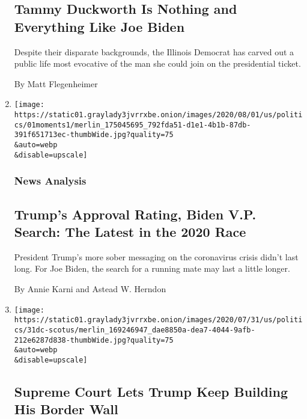 \begin{enumerate}
{  \subsection{Tammy Duckworth Is Nothing and Everything Like Joe
  Biden}\label{tammy-duckworth-is-nothing-and-everything-like-joe-biden}}

  Despite their disparate backgrounds, the Illinois Democrat has carved
  out a public life most evocative of the man she could join on the
  presidential ticket.

  By Matt Flegenheimer
\item
  \href{/2020/08/01/us/politics/trump-biden-polls-vp.html}{}

  \texttt{[image: https://static01.graylady3jvrrxbe.onion/images/2020/08/01/us/politics/01moments1/merlin\_175045695\_792fda51-d1e1-4b1b-87db-391f651713ec-thumbWide.jpg?quality=75\\\&auto=webp\\\&disable=upscale]}

  \hypertarget{news-analysis}{%
  \subsubsection{News Analysis}\label{news-analysis}}

  \hypertarget{trumps-approval-rating-biden-vp-search-the-latest-in-the-2020-race}{%
  \subsection{Trump's Approval Rating, Biden V.P. Search: The Latest in
  the 2020
  Race}\label{trumps-approval-rating-biden-vp-search-the-latest-in-the-2020-race}}

  President Trump's more sober messaging on the coronavirus crisis
  didn't last long. For Joe Biden, the search for a running mate may
  last a little longer.

  By Annie Karni and Astead W. Herndon
\item
  \href{/2020/07/31/us/supreme-court-trump-border-wall.html}{}

  \texttt{[image: https://static01.graylady3jvrrxbe.onion/images/2020/07/31/us/politics/31dc-scotus/merlin\_169246947\_dae8850a-dea7-4044-9afb-212e6287d838-thumbWide.jpg?quality=75\\\&auto=webp\\\&disable=upscale]}

  \hypertarget{supreme-court-lets-trump-keep-building-his-border-wall}{%
  \subsection{Supreme Court Lets Trump Keep Building His Border
  Wall}\label{supreme-court-lets-trump-keep-building-his-border-wall}}


\end{enumerate}
